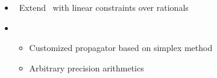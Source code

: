 \begin{frame}{\clingolpx}
  \begin{itemize}
  \item {} \ Extend \clingo\ with linear constraints over rationals
  \item {} \
    \begin{itemize}
    \item Customized propagator based on simplex method
    \item Arbitrary precision arithmetics
    \end{itemize}
  \end{itemize}
\end{frame}
%
